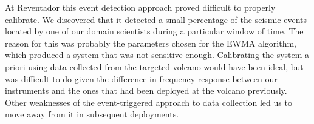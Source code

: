 At Reventador this event detection approach proved difficult to properly
calibrate. We discovered that it detected a small percentage of the seismic
events located by one of our domain scientists during a particular window of
time. The reason for this was probably the parameters chosen for the EWMA
algorithm, which produced a system that was not sensitive enough. Calibrating
the system a priori using data collected from the targeted volcano would have
been ideal, but was difficult to do given the difference in frequency
response between our instruments and the ones that had been deployed at the
volcano previously.  Other weaknesses of the event-triggered approach to data
collection led us to move away from it in subsequent deployments.
